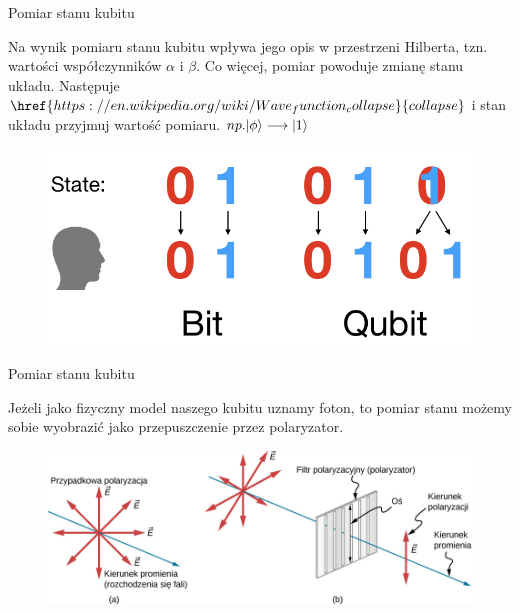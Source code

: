 \documentclass{beamer}
\DeclarePairedDelimiter\ket{\lvert}{\rangle}
\begin{document}
	\begin{frame}{Pomiar stanu kubitu}
		\begin{block}{}
			\vspace{0.5em}
			Na wynik pomiaru stanu kubitu wpływa jego opis w przestrzeni Hilberta, tzn. wartości współczynników $\alpha$ i $\beta$.
			Co więcej, pomiar powoduje zmianę stanu układu. Następuje $\href{https://en.wikipedia.org/wiki/Wave_function_collapse}{collapse}$ i stan układu przyjmuj wartość pomiaru. $np. \ket{\phi} \longrightarrow \ket{1}$
			\vspace{0.5em}
		\end{block}
		
		\vspace{0.5em}
		\begin{center}
			\begin{figure}
				\includegraphics[scale=0.25]{media/collapse.jpg}
			\end{figure}
		\end{center}
		\vspace{0.5em}
	\end{frame}

	\begin{frame}{Pomiar stanu kubitu}
			\begin{block}{}
			\vspace{0.5em}
			Jeżeli jako fizyczny model naszego kubitu uznamy foton, to pomiar stanu możemy sobie wyobrazić jako przepuszczenie przez polaryzator.
			\vspace{0.5em}
		\end{block}
	
		\begin{figure}
			\includegraphics[scale=0.33]{media/foton_pomiar.png}
		\end{figure}
	\end{frame}
\end{document}
